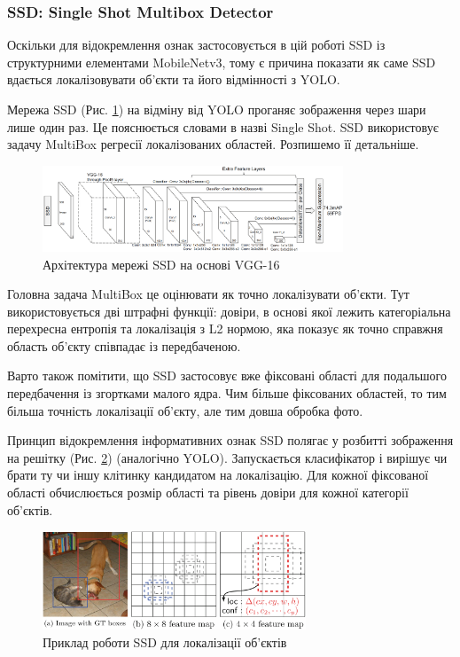 \subsubsection{SSD: Single Shot Multibox Detector}

Оскільки для відокремлення ознак застосовується в цій роботі SSD із
структурними елементами MobileNetv3, тому є причина показати як саме SSD вдається
локалізовувати об'єкти та його відмінності з YOLO.

Мережа SSD (Рис. \ref{fig:cnn:ssd_architecture}) на відміну від YOLO проганяє зображення
через шари лише один раз. Це пояснюється словами в назві Single Shot. SSD
використовує задачу MultiBox регресії
локалізованих областей. Розпишемо її детальніше.

\begin{figure}[H]
    \centering
    \includegraphics[width=0.8\textwidth]{images/cnn_ssd_architecture}
    \caption{Архітектура мережі SSD на основі VGG-16    \cite{ssd}
        \label{fig:cnn:ssd_architecture}
    }
\end{figure}

Головна задача MultiBox це оцінювати як точно локалізувати об'єкти. Тут використовується
дві штрафні функції: довіри, в основі якої лежить категоріальна перехресна ентропія та
локалізація з L2 нормою, яка показує як точно справжня область об'єкту співпадає
із передбаченою.

Варто також помітити, що SSD застосовує вже фіксовані області для подальшого передбачення
із згортками малого ядра.
Чим більше фіксованих областей, то тим більша точність локалізації об'єкту,
але тим довша обробка фото.

Принцип відокремлення інформативних ознак SSD полягає у розбитті зображення на решітку
(Рис. \ref{fig:cnn:ssd_work_example}) (аналогічно YOLO). Запускається класифікатор
і вирішує чи брати ту чи іншу клітинку
кандидатом на локалізацію. Для кожної фіксованої області обчислюється розмір
області та рівень довіри для кожної категорії об'єктів.

\begin{figure}[H]
    \centering
    \includegraphics[width=0.7\textwidth]{images/cnn_ssd_work_example}
    \caption{Приклад роботи SSD для локалізації об'єктів \cite{ssd}
        \label{fig:cnn:ssd_work_example}
    }
\end{figure}


